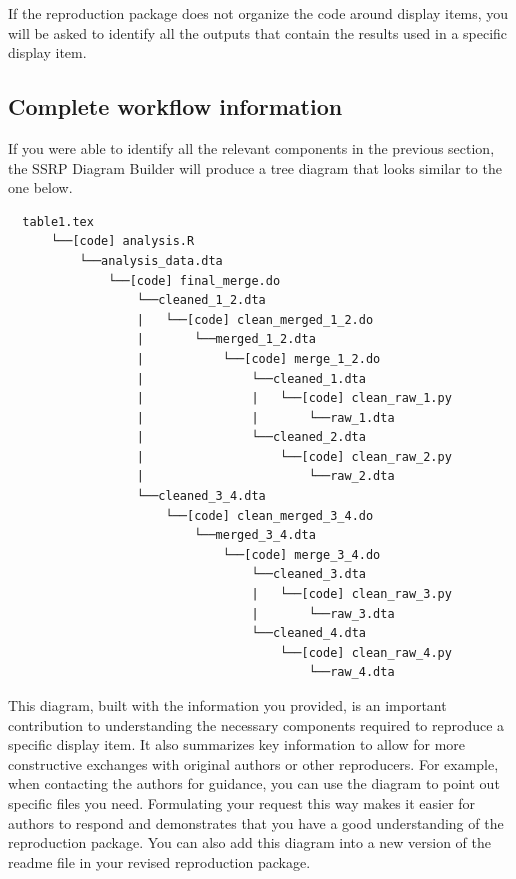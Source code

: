 \documentclass[
]{book}
\begin{document}
If the reproduction package does not organize the code around display items, you will be asked to identify all the outputs that contain the results used in a specific display item.

\hypertarget{complete-tree}{%
\subsection{Complete workflow information}\label{complete-tree}}

If you were able to identify all the relevant components in the previous section, the SSRP Diagram Builder will produce a tree diagram that looks similar to the one below.

\begin{verbatim}
  table1.tex
      └──[code] analysis.R
          └──analysis_data.dta
              └──[code] final_merge.do
                  └──cleaned_1_2.dta
                  |   └──[code] clean_merged_1_2.do
                  |       └──merged_1_2.dta
                  |           └──[code] merge_1_2.do
                  |               └──cleaned_1.dta
                  |               |   └──[code] clean_raw_1.py
                  |               |       └──raw_1.dta
                  |               └──cleaned_2.dta
                  |                   └──[code] clean_raw_2.py
                  |                       └──raw_2.dta
                  └──cleaned_3_4.dta
                      └──[code] clean_merged_3_4.do
                          └──merged_3_4.dta
                              └──[code] merge_3_4.do
                                  └──cleaned_3.dta
                                  |   └──[code] clean_raw_3.py
                                  |       └──raw_3.dta
                                  └──cleaned_4.dta
                                      └──[code] clean_raw_4.py
                                          └──raw_4.dta
\end{verbatim}

This diagram, built with the information you provided, is an important contribution to understanding the necessary components required to reproduce a specific display item. It also summarizes key information to allow for more constructive exchanges with original authors or other reproducers. For example, when contacting the authors for guidance, you can use the diagram to point out specific files you need. Formulating your request this way makes it easier for authors to respond and demonstrates that you have a good understanding of the reproduction package. You can also add this diagram into a new version of the readme file in your revised reproduction package.
\end{document}
